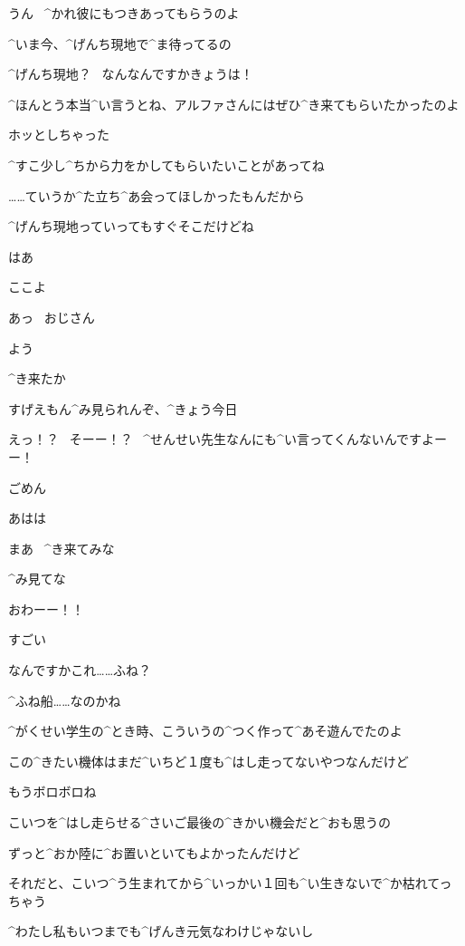 \Sensei うん
\ ^{かれ}{彼}にもつきあってもらうのよ

\Sensei ^{いま}{今}、^{げんち}{現地}で^{ま}{待}ってるの

\Alpha ^{げんち}{現地}？
\ なんなんですかきょうは！

\page
\Sensei ^{ほんとう}{本当}^{い}{言}うとね、アルファさんにはぜひ^{き}{来}てもらいたかったのよ

\Sensei ホッとしちゃった

\Sensei ^{すこ}{少}し^{ちから}{力}をかしてもらいたいことがあってね

\Sensei ……ていうか^{た}{立}ち^{あ}{会}ってほしかったもんだから

\page
\Sensei ^{げんち}{現地}っていってもすぐそこだけどね

\Alpha はあ

\Sensei ここよ

\page
\Alpha あっ
\ おじさん

\Ojisan よう

\page
\Ojisan ^{き}{来}たか

\Ojisan すげえもん^{み}{見}られんぞ、^{きょう}{今日}

\Alpha えっ！？
\ そーー！？
\ ^{せんせい}{先生}なんにも^{い}{言}ってくんないんですよーー！

\Sensei ごめん

\Alpha あはは

\Ojisan まあ
\ ^{き}{来}てみな

\Ojisan ^{み}{見}てな

\page
\Alpha おわーー！！

\page
\Alpha すごい

\Alpha なんですかこれ……ふね？

\Sensei ^{ふね}{船}……なのかね

\Sensei ^{がくせい}{学生}の^{とき}{時}、こういうの^{つく}{作}って^{あそ}{遊}んでたのよ

\Sensei この^{きたい}{機体}はまだ^{いちど}{１度}も^{はし}{走}ってないやつなんだけど

\Sensei もうボロボロね

\Sensei こいつを^{はし}{走}らせる^{さいご}{最後}の^{きかい}{機会}だと^{おも}{思}うの

\page
\Sensei ずっと^{おか}{陸}に^{お}{置}いといてもよかったんだけど

\Sensei それだと、こいつ^{う}{生}まれてから^{いっかい}{１回}も^{い}{生}きないで^{か}{枯}れてっちゃう

\Sensei ^{わたし}{私}もいつまでも^{げんき}{元気}なわけじゃないし


